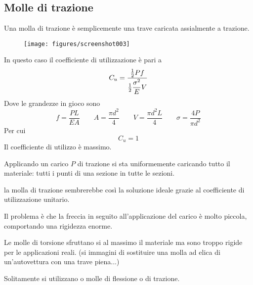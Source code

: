 \documentclass[a4paper, 15pt]{article}
\begin{document}
\subsection{Molle di trazione}
\begin{adjustwidth}{2in}{}
	Una molla di trazione è semplicemente una trave caricata assialmente a trazione. 	
	\begin{figure}[H]
		\centering
		\texttt{[image: figures/screenshot003]}
		\label{fig:screenshot003}
	\end{figure}
	In questo caso il coefficiente di utilizzazione è pari a 
	\[C_u = \dfrac{{1\over2}Pf}{{1\over2}\dfrac{\sigma^2}{E}V}\]
	Dove le grandezze in gioco sono 
	\[f = \dfrac{PL}{EA}\qquad A = \dfrac{\pi d^2}{4}\qquad V = \dfrac{\pi d^2L}{4}\qquad \sigma = \dfrac{4P}{\pi d^2}\]
	Per cui
	\[C_u = 1\]
	Il coefficiente di utilizzo è massimo. 
	
	Applicando un carico $P$ di trazione si sta uniformemente caricando tutto il materiale: tutti i punti di una sezione in tutte le sezioni. \newline 
	
	la molla di trazione sembrerebbe così la soluzione ideale grazie al coefficiente di utilizzazione unitario. 
	
	Il problema è che la freccia in seguito all'applicazione del carico è molto piccola, comportando una rigidezza enorme. 
	
	Le molle di torsione sfruttano si al massimo il materiale ma sono troppo rigide per le applicazioni reali. (si immagini di sostituire una molla ad elica di un'autovettura con una trave piena...)\newline 
	
	Solitamente si utilizzano o molle di flessione o di trazione. 
\end{adjustwidth}
\newpage
\end{document}
